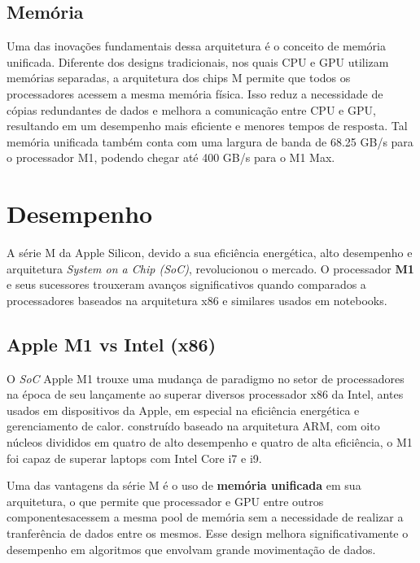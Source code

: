 \documentclass[a4paper,times,12pt]{article}
\begin{document}
\subsection{Memória}
\hspace{+15pt}
Uma das inovações fundamentais dessa arquitetura é o conceito de memória unificada. Diferente dos designs tradicionais, nos quais CPU e GPU utilizam memórias separadas, a arquitetura dos chips M permite que todos os processadores acessem a mesma memória física. Isso reduz a necessidade de cópias redundantes de dados e melhora a comunicação entre CPU e GPU, resultando em um desempenho mais eficiente e menores tempos de resposta. Tal memória unificada também conta com uma largura de banda de 68.25 GB/s para o processador M1, podendo chegar até 400 GB/s para o M1 Max.

\newpage
\section{Desempenho}
\hspace{+15pt}
A série M da Apple Silicon, devido a sua eficiência energética, alto desempenho e arquitetura \textit{System on a Chip (SoC)}, revolucionou o mercado. O processador \textbf{M1} e seus sucessores trouxeram avanços significativos quando comparados a processadores baseados na arquitetura x86 e similares usados em notebooks.

\subsection{Apple M1 vs Intel (x86)}
\hspace{+15pt}
O \textit{SoC} Apple M1 trouxe uma mudança de paradigmo no setor de processadores na época de seu lançamente ao superar diversos processador x86 da Intel, antes usados em dispositivos da Apple, em especial na eficiência energética e gerenciamento de calor. construído baseado na arquitetura ARM, com oito núcleos divididos em quatro de alto desempenho e quatro de alta eficiência, o M1 foi capaz de superar laptops com Intel Core i7 e i9.

Uma das vantagens da série M é o uso de \textbf{memória unificada} em sua arquitetura, o que permite que processador e GPU entre outros componentesacessem a mesma pool de memória sem a necessidade de realizar a tranferência de dados entre os mesmos.\cite{apple_silicon_potential} Esse design melhora significativamente o desempenho em algoritmos que envolvam grande movimentação de dados.\cite{apple_m_vs_intel}
\end{document}
